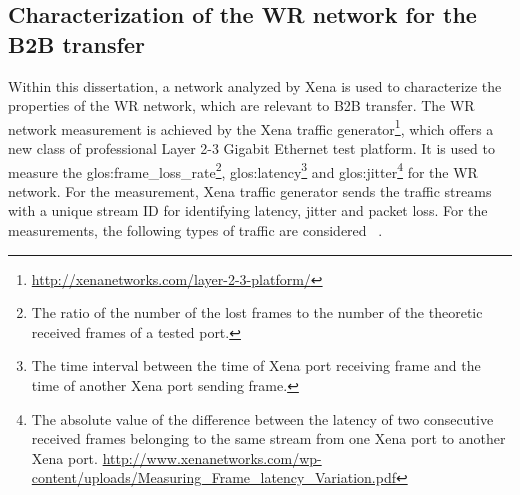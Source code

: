 \subsection{Characterization of the WR network for the B2B transfer}
Within this dissertation, a network analyzed by Xena is used to characterize the properties of the WR network, which are relevant to B2B transfer. The WR network measurement is achieved by the Xena traffic generator\footnote{\url{http://xenanetworks.com/layer-2-3-platform/}}, which offers a new class of professional Layer 2-3 Gigabit Ethernet test platform. It is used to measure the \gls{glos:frame_loss_rate}\footnote{The ratio of the number of the lost frames to the number of the theoretic received frames of a tested port.}, \gls{glos:latency}\footnote{The time interval between the time of Xena port receiving frame and the time of another Xena port sending frame.} and \gls{glos:jitter}\footnote{The absolute value of the difference between the latency of two consecutive received frames belonging to the same stream from one Xena port to another Xena port. \newline\url{http://www.xenanetworks.com/wp-content/uploads/Measuring_Frame_latency_Variation.pdf}} for the WR network. For the measurement, Xena traffic generator sends the traffic streams with a unique stream ID for identifying latency, jitter and packet loss. For the measurements, the following types of traffic are considered ~\cite{prados_testing_2016}.

